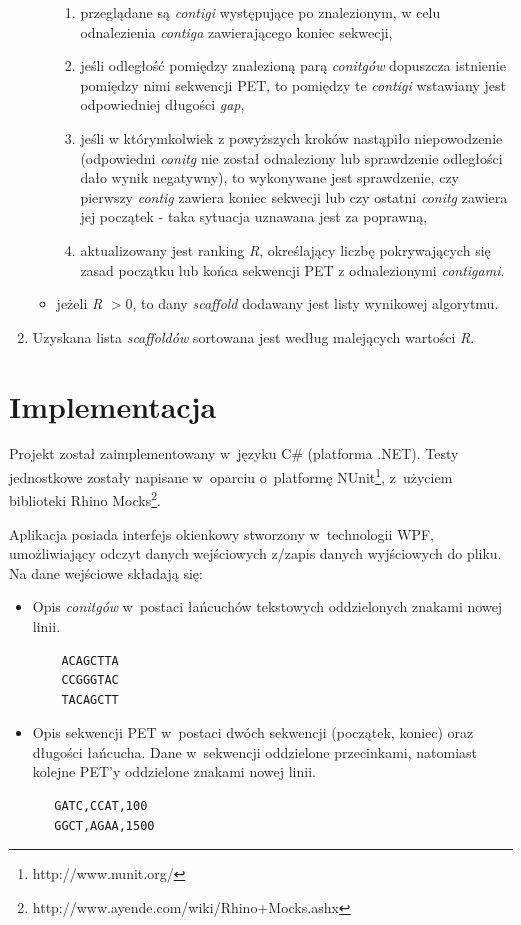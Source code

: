 \documentclass[a4paper,10pt]{article}
\begin{document}
\begin{enumerate}
\begin{itemize}
\begin{enumerate}
     \item \label{step3_2} przeglądane są \emph{contigi} występujące po znalezionym, w celu odnalezienia \emph{contiga} zawierającego koniec sekwecji,
     \item \label{step3_3} jeśli odległość pomiędzy znalezioną parą \emph{conitgów} dopuszcza istnienie pomiędzy nimi sekwencji PET, to  pomiędzy te \emph{contigi} wstawiany jest odpowiedniej długości \emph{gap},
     \item \label{step3_4} jeśli w którymkolwiek z powyższych kroków nastąpiło niepowodzenie (odpowiedni \emph{conitg} nie został odnaleziony lub sprawdzenie odległości dało wynik negatywny), to wykonywane jest sprawdzenie, czy pierwszy \emph{contig} zawiera koniec sekwecji lub czy ostatni \emph{conitg} zawiera jej  początek - taka sytuacja uznawana jest za poprawną,
     \item \label{step3_5} aktualizowany jest ranking \emph{R}, określający liczbę pokrywających się zasad początku lub końca sekwencji PET z odnalezionymi \emph{contigami}.
    \end{enumerate}
   \item jeżeli \emph{R} $> 0$, to dany \emph{scaffold} dodawany jest listy wynikowej algorytmu.
  \end{itemize}
 \item \label{step4} Uzyskana lista \emph{scaffoldów} sortowana jest według malejących wartości \emph{R}.
\end{enumerate}

\section*{Implementacja}

Projekt został zaimplementowany w~języku C\# (platforma .NET). Testy jednostkowe zostały napisane w~oparciu o~platformę NUnit\footnote{http://www.nunit.org/}, z~użyciem biblioteki Rhino Mocks\footnote{http://www.ayende.com/wiki/Rhino+Mocks.ashx}.

Aplikacja posiada interfejs okienkowy stworzony w~technologii WPF, umożliwiający odczyt danych wejściowych z/zapis danych wyjściowych do pliku. Na dane wejściowe składają się:

\begin{itemize}
 \item Opis \emph{conitgów} w~postaci łańcuchów tekstowych oddzielonych znakami nowej linii.
 
  \begin{verbatim}
    ACAGCTTA
    CCGGGTAC
    TACAGCTT
  \end{verbatim}
  \item Opis sekwencji PET w~postaci dwóch sekwencji (początek, koniec) oraz długości łańcucha. Dane w~sekwencji oddzielone przecinkami, natomiast kolejne PET'y oddzielone znakami nowej linii.
  
  \begin{verbatim}
   GATC,CCAT,100
   GGCT,AGAA,1500
  \end{verbatim}
\end{itemize}
\end{document}
